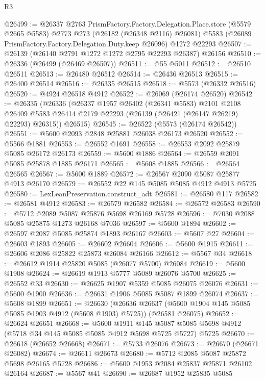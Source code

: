 \begin{lexlean}{R3}
\begin{coremodule}
@26499 := @26337
    @2763
    PrismFactory.Factory.Delegation.Place.store
    (@5579 @2665 @5583)
    @2773
    @273
    (@26182 (@26348 @2116) @26081)
    @5583
    (@26089 PrismFactory.Factory.Delegation.Duty.keep @26096)
    @1272
    @22293
@26507 := @26139 (@26140 @2791 @1272 @1272 @2795 @22293 @26387) @26156
@26510 := @26336 (@26499 (@26469 @26507))
@26511 := @55 @5011
@26512 := @26510 @26511
@26513 := @26480 @26512
@26514 := @26436 @26513
@26515 := @26400 @26514
@26516 := @26335 @26515
@26518 := @5573 (@26332 @26516)
@26520 := @4924 @26518 @4912
@26522 := @26069 (@26174 @26520)
@26542 := @26335
    (@26336
      (@26337
        @1957
        @26402
        (@26341 @5583)
        @2101
        @2108
        @26409
        @5583
        @26414
        @2179
        @22293
        (@26139 (@26421 (@26147 @26219) @22293) @26315))
      @26515)
@26545 := @26522 (@5573 (@26174 @26542))
@26551 := @5600 @2093 @2848 @25881 @26038 @26173 @26520
@26552 := @5566 @1881
@26553 := @26552 @1691
@26558 := @26553 @2092 @25879 @5085 @26172 @26173
@26559 := @5600 @1886
@26564 := @26559 @2091 @5085 @25878 @1885 @26171
@26565 := @5608 @1885
@26566 := @26564 @26565
@26567 := @5600 @1889
@26572 := @26567 @2090 @5087 @25877 @4913 @26170
@26579 := @26552 @22 @145 @5085 @5085 @4912 @4913 @5725
@26580 := LexLeanPreservation.construct_adt
@26581 := @26580 @117
@26582 := @26581 @4912
@26583 := @26579 @26582
@26584 := @26572 @26583
@26590 := @5712 @2089 @5087 @25876 @5698 @26169 @5728
@26596 := @7030 @2088 @5085 @25875 @1273 @26168 @7036
@26597 := @5600 @1894
@26602 := @26597 @2087 @5085 @25874 @1893 @26167
@26603 := @5607 @27
@26604 := @26603 @1893
@26605 := @26602 @26604
@26606 := @5600 @1915
@26611 := @26606 @2086 @25822 @25873 @26084 @26166
@26612 := @5567 @34
@26618 := @26612 @1914 @25820 @5085 (@26077 @5700) @26084
@26619 := @5600 @1908
@26624 := @26619 @1913 @5777 @5089 @26076 @5700
@26625 := @26552 @33
@26630 := @26625 @1907 @5359 @5085 @26075 @26076
@26631 := @5600 @1900
@26636 := @26631 @1906 @5085 @5087 @1899 @26074
@26637 := @5608 @1899
@26651 := @26630
    (@26636 @26637 (@5600 @1904 @145 @5085 @5085 @1903 @4912 (@5608 @1903) @5725))
    (@26581 @26075)
@26652 := @26624 @26651
@26668 := @5600
    @1911
    @145
    @5087
    @5085
    @5698
    @4912
    (@5718 @34 @145 @5085 @5085 @4912 @5698 @5725 @5727)
    @5725
@26670 := @26618 (@26652 @26668)
@26671 := @5733 @26076
@26673 := @26670 (@26671 @26082)
@26674 := @26611 @26673
@26680 := @5712 @2085 @5087 @25872 @5698 @26165 @5728
@26686 := @5600 @1953 @2084 @25837 @25871 @26102 @26164
@26687 := @5567 @41
@26690 := @26687 @1952 @25835 @5085

\end{coremodule}
\end{lexlean}
